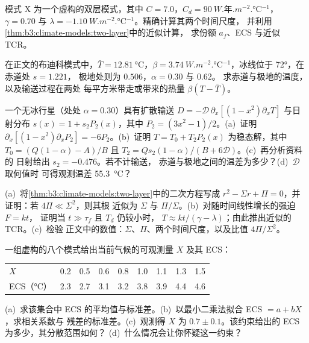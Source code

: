 \begin{exercise}[$\star\star$]\label{exo:b3:climate-models:8}
模式 X 为一个虚构的双层模式，其中 $C = 7.0$，$C_d =
\qty{90}{W.\text{年}.m^{-2}.\celsius^{-1}}$，$\gamma = 0.70$ 与 $\lambda =
\qty{-1.10}{W.m^{-2}.\celsius^{-1}}$。精确计算其两个时间尺度，
并利用\cref{thm:b3:climate-models:two-layer}中的近似计算，
求份额 $a_f$、ECS 与近似 TCR。
\end{exercise}

\begin{exercise}[$\star\star$]\label{exo:b3:climate-models:9}
在正文的布迪科模式中，$\bar T = \qty{12.81}{\celsius}$，$\beta =
\qty{3.74}{W.m^{-2}.\celsius^{-1}}$，冰线位于 \ang{72}，在赤道处 $s = 1.221$，
极地处则为 $0.506$，$\alpha = 0.30$ 与 $0.62$。
求赤道与极地的温度，以及输送过程在两处
每平方米带走或带来的热量
$\beta(T - \bar T)$。
\end{exercise}

\begin{exercise}[$\star\star\star$]\label{exo:b3:climate-models:10}
一个无冰行星（处处 $\alpha = 0.30$）具有扩散输送
$D = -\mathcal D\,\partial_x[(1 - x^2)\partial_xT]$ 与日射分布
$s(x) = 1 + s_2P_2(x)$，其中 $P_2 = (3x^2 - 1)/2$。(a)~证明
$\partial_x[(1 - x^2)\partial_xP_2] = -6P_2$。(b)~证明 $T = T_0 +
T_2P_2(x)$ 为稳态解，其中 $T_0 = (Q(1 - \alpha) - A)/B$ 且
$T_2 = Qs_2(1 - \alpha)/(B + 6\mathcal D)$。(c)~再分析资料的
日射给出 $s_2 = \num{-0.476}$。若不计输送，
赤道与极地之间的温差为多少？(d)~$\mathcal D$ 取何值时
可得观测温差 \qty{55.3}{\celsius}？
\end{exercise}

\begin{exercise}[$\star\star\star$]\label{exo:b3:climate-models:11}
(a)~将\cref{thm:b3:climate-models:two-layer}中的二次方程写成 $r^2 -
\Sigma r + \Pi = 0$，并证明：若 $4\Pi \ll \Sigma^2$，则其根
近似为 $\Sigma$ 与 $\Pi/\Sigma$。(b)~对随时间线性增长的强迫 $F = kt$，
证明当 $t \gg \tau_f$ 且 $T_d$ 仍较小时，
$T \approx kt/(\gamma - \lambda)$；由此推出近似的 TCR。(c)~检验
正文中的数值：$\Sigma$、$\Pi$、两个时间尺度，以及比值
$4\Pi/\Sigma^2$。
\end{exercise}

\begin{exercise}[$\star\star\star$]\label{exo:b3:climate-models:12}
一组虚构的八个模式给出当前气候的可观测量 $X$ 及其
ECS：
\begin{center}
\begin{tabular}{l*{8}{c}}
\hline
$X$ & 0.2 & 0.5 & 0.6 & 0.8 & 1.0 & 1.1 & 1.3 & 1.5\\
ECS（\unit{\celsius}）& 2.3 & 2.7 & 3.1 & 3.2 & 3.8 & 3.9 & 4.4 & 4.6\\
\hline
\end{tabular}
\end{center}
(a)~求该集合中 ECS 的平均值与标准差。(b)~以最小二乘法拟合
ECS $= a + bX$，求相关系数与
残差的标准差。(c)~观测得 $X$ 为 $0.7
\pm 0.1$。该约束给出的 ECS 为多少，其分散范围如何？
(d)~什么情况会让你怀疑这一约束？
\end{exercise}

